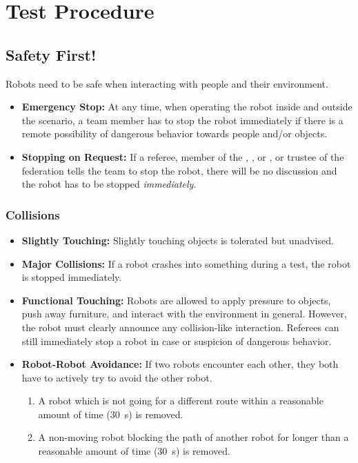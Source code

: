 \section{Test Procedure}
\label{sec:rules:testprocedure}

\subsection{Safety First!}
\label{sec:rules:safetyfirst}
Robots need to be safe when interacting with people and their environment.
\begin{itemize}
	\item \textbf{Emergency Stop:} At any time, when operating the robot inside and outside the scenario, a team member has to stop the robot immediately if there is a remote possibility of dangerous behavior towards people and/or objects.
	\item \textbf{Stopping on Request:} If a referee, member of the , , or , or trustee of the federation tells the team to stop the robot, there will be no discussion and the robot has to be stopped \emph{immediately}.
\end{itemize}

\subsubsection{Collisions}
\label{sec:rules:collisions}
\begin{itemize}
	\item \textbf{Slightly Touching:} Slightly touching objects is tolerated but unadvised.
	
	\item \textbf{Major Collisions:} If a robot crashes into something during a test, the robot is stopped immediately.
	
	\item \textbf{Functional Touching:} Robots are allowed to apply pressure to objects, push away furniture, and interact with the environment in general. However, the robot must clearly announce any collision-like interaction. Referees can still immediately stop a robot in case or suspicion of dangerous behavior.
	
	\item \textbf{Robot-Robot Avoidance:} If two robots encounter each other, they both have to actively try to avoid the other robot.
	\begin{enumerate}
		\item A robot which is not going for a different route within a reasonable amount of time (\SI{30}{\second}) is removed.
		\item A non-moving robot blocking the path of another robot for longer than a reasonable amount of time (\SI{30}{\second}) is removed.
	\end{enumerate}
\end{itemize}

